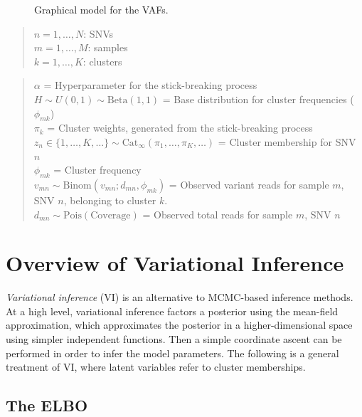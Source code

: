 \documentclass[11pt]{article}
\newcommand{\adjustimg}{%
  \checkoddpage%
  \ifoddpage\hspace*{\dimexpr\evensidemargin-\oddsidemargin}\else\hspace*{-\dimexpr\evensidemargin-\oddsidemargin}\fi%
}
\newcommand{\centerimg}[2][width=\textwidth]{%
  \makebox[\textwidth]{\adjustimg\texttt{[image: \#2]}}%
}
\begin{document}
\begin{figure}[h]
\centerimg[scale=1.0]{multi_pgm.png}
\caption{Graphical model for the VAFs.}
\label{fig:GM}
\end{figure}

\begin{quote}
$n = 1, \ldots , N$:  SNVs \\
$m = 1, \ldots , M$: samples \\
$k = 1, \ldots ,  K$: clusters
\end{quote}

\begin{quote}
$\alpha$ = Hyperparameter for the stick-breaking process \\[2pt]
$H \sim U(0,1) \sim \mathrm{Beta}(1, 1)$ = Base distribution for cluster frequencies ($\phi_{mk}$)	 \\[2pt]
$\pi_k$ =  Cluster weights, generated from the stick-breaking process \\[2pt]
$z_{n} \in \{1, \ldots, K, \ldots \}  \sim \mathrm{Cat}_\infty(\pi_1, \ldots, \pi_K, \ldots)$ =  Cluster membership for SNV $n$\\[2pt]
$\phi_{mk}$ = Cluster frequency \\ [2pt]
$v_{mn} \sim \mathrm{Binom}(v_{mn}; d_{mn}, \phi_{mk})$ = {\smaller Observed variant reads for sample $m$, SNV $n$, belonging to cluster $k$.} \\ [2pt]
$d_{mn} \sim \mathrm{Pois}(\text{Coverage})$ = Observed total reads for sample $m$, SNV $n$
\end{quote}
\vspace{0.05cm}

\newpage
\section{Overview of Variational Inference}

\emph{Variational inference} (VI) is an alternative to MCMC-based inference methods. At a high level, variational inference factors a posterior using the mean-field approximation, which approximates the posterior in a higher-dimensional space using simpler independent functions. Then a simple coordinate ascent can be performed in order to infer the model parameters. The following is a general treatment of VI, where latent variables refer to cluster memberships.

\subsection{The \textsc{ELBO}}
\end{document}
